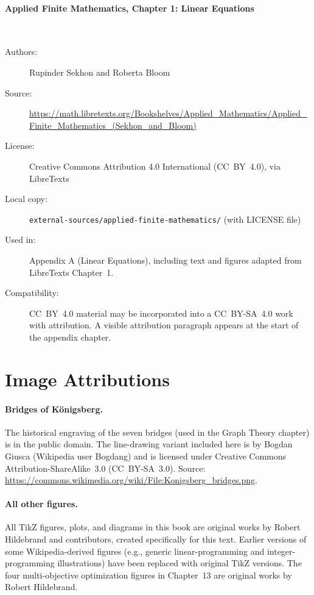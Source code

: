 \paragraph{Applied Finite Mathematics, Chapter 1: Linear Equations}\hspace{0pt}\\[-0.6em]
\begin{description}
  \item[Authors:] Rupinder Sekhon and Roberta Bloom
  \item[Source:] \url{https://math.libretexts.org/Bookshelves/Applied_Mathematics/Applied_Finite_Mathematics_(Sekhon_and_Bloom)}
  \item[License:] Creative Commons Attribution 4.0 International
    (CC~BY~4.0), via LibreTexts
  \item[Local copy:] \texttt{external-sources/applied-finite-mathematics/}
    (with LICENSE file)
  \item[Used in:] Appendix A (Linear Equations), including text and
    figures adapted from LibreTexts Chapter~1.
  \item[Compatibility:] CC~BY~4.0 material may be incorporated into a
    CC~BY-SA~4.0 work with attribution. A visible attribution paragraph
    appears at the start of the appendix chapter.
\end{description}

\section*{Image Attributions}

\paragraph{Bridges of K\"onigsberg.}
The historical engraving of the seven bridges (used in the Graph
Theory chapter) is in the public domain. The line-drawing variant
included here is by Bogdan Giusca (Wikipedia user Bogdang) and is
licensed under Creative Commons Attribution-ShareAlike~3.0 (CC~BY-SA~3.0).
Source: \url{https://commons.wikimedia.org/wiki/File:Konigsberg_bridges.png}.

\paragraph{All other figures.}
All TikZ figures, plots, and diagrams in this book are original works
by Robert Hildebrand and contributors, created specifically for this
text. Earlier versions of some Wikipedia-derived figures
(e.g., generic linear-programming and integer-programming illustrations)
have been replaced with original TikZ versions. The four
multi-objective optimization figures in Chapter~13 are original
works by Robert Hildebrand.

